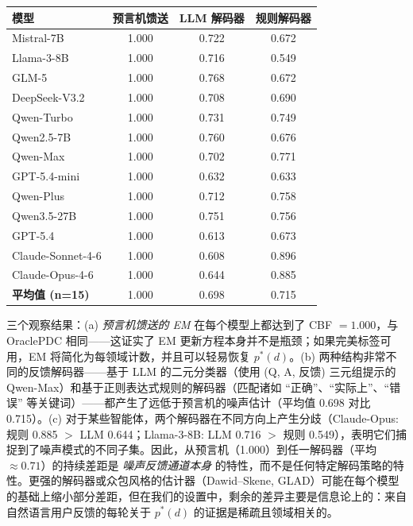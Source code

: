 \documentclass[11pt,a4paper,fontset=fandol]{ctexart}
\begin{document}
\begin{center}
\small
\begin{tabular}{l ccc}
\toprule
\textbf{模型} & \textbf{预言机馈送} & \textbf{LLM 解码器} & \textbf{规则解码器} \\
\midrule
Mistral-7B          & 1.000 & 0.722 & 0.672 \\
Llama-3-8B          & 1.000 & 0.716 & 0.549 \\
GLM-5               & 1.000 & 0.768 & 0.672 \\
DeepSeek-V3.2       & 1.000 & 0.708 & 0.690 \\
Qwen-Turbo          & 1.000 & 0.731 & 0.749 \\
Qwen2.5-7B          & 1.000 & 0.760 & 0.676 \\
Qwen-Max            & 1.000 & 0.702 & 0.771 \\
GPT-5.4-mini        & 1.000 & 0.632 & 0.633 \\
Qwen-Plus           & 1.000 & 0.712 & 0.758 \\
Qwen3.5-27B         & 1.000 & 0.751 & 0.756 \\
GPT-5.4             & 1.000 & 0.613 & 0.673 \\
Claude-Sonnet-4-6   & 1.000 & 0.608 & 0.896 \\
Claude-Opus-4-6     & 1.000 & 0.644 & 0.885 \\
\midrule
\textbf{平均值 (n=15)} & 1.000 & 0.698 & 0.715 \\
\bottomrule
\end{tabular}
\end{center}

三个观察结果：(a) \emph{预言机馈送的 EM} 在每个模型上都达到了 CBF $= 1.000$，与 OraclePDC 相同——这证实了 EM 更新方程本身并不是瓶颈；如果完美标签可用，EM 将简化为每领域计数，并且可以轻易恢复 $p^*(d)$。(b) 两种结构非常不同的反馈解码器——基于 LLM 的二元分类器（使用 (Q, A, 反馈) 三元组提示的 Qwen-Max）和基于正则表达式规则的解码器（匹配诸如 “正确”、“实际上”、“错误” 等关键词）——都产生了远低于预言机的噪声估计（平均值 0.698 对比 0.715）。(c) 对于某些智能体，两个解码器在不同方向上产生分歧（Claude-Opus: 规则 0.885 $>$ LLM 0.644；Llama-3-8B: LLM 0.716 $>$ 规则 0.549），表明它们捕捉到了噪声模式的不同子集。因此，从预言机（1.000）到任一解码器（平均 $\approx 0.71$）的持续差距是 \emph{噪声反馈通道本身} 的特性，而不是任何特定解码策略的特性。更强的解码器或众包风格的估计器（Dawid--Skene, GLAD）可能在每个模型的基础上缩小部分差距，但在我们的设置中，剩余的差异主要是信息论上的：来自自然语言用户反馈的每轮关于 $p^*(d)$ 的证据是稀疏且领域相关的。
\end{document}
